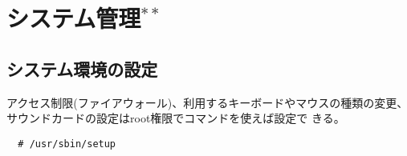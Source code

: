 \documentclass{jreport}
\begin{document}
%
%
%
%
%
%
%
%


\chapter{システム管理$^{**}$}

\section{システム環境の設定}
アクセス制限(ファイアウォール)、利用するキーボードやマウスの種類の変更、
サウンドカードの設定はroot権限でコマンドを使えば設定で
きる。
\begin{screen}
\begin{verbatim}
  # /usr/sbin/setup
\end{verbatim}
\end{screen}
\end{document}
